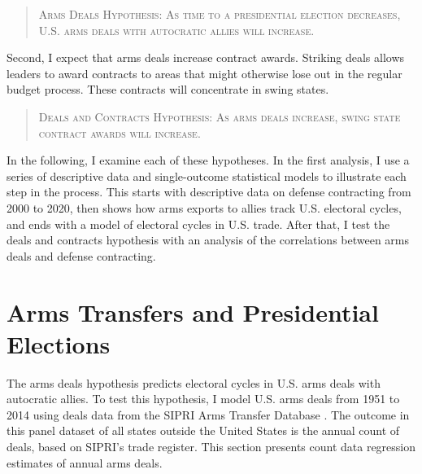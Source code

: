 \documentclass[12pt]{article}
\begin{document}
\begin{quote}
\textsc{Arms Deals Hypothesis: As time to a presidential election decreases, U.S. arms deals with autocratic allies will increase.}
\end{quote}


% 
%


Second, I expect that arms deals increase contract awards.
Striking deals allows leaders to award contracts to areas that might otherwise lose out in the regular budget process. 
These contracts will concentrate in swing states. 


\begin{quote}
\textsc{Deals and Contracts Hypothesis: As arms deals increase, swing state contract awards will increase.}
\end{quote}


In the following, I examine each of these hypotheses. 
In the first analysis, I use a series of descriptive data and single-outcome statistical models to illustrate each step in the process.
This starts with descriptive data on defense contracting from 2000 to 2020, then shows how arms exports to allies track U.S. electoral cycles, and ends with a model of electoral cycles in U.S. trade. 
After that, I test the deals and contracts hypothesis with an analysis of the correlations between arms deals and defense contracting. 


\section{Arms Transfers and Presidential Elections}


The arms deals hypothesis predicts electoral cycles in U.S. arms deals with autocratic allies.
To test this hypothesis, I model U.S. arms deals from 1951 to 2014 using deals data from the SIPRI Arms Transfer Database \citep{SIPRI2021}.
The outcome in this panel dataset of all states outside the United States is the annual count of deals, based on SIPRI's trade register. 
This section presents count data regression estimates of annual arms deals. 
\end{document}
